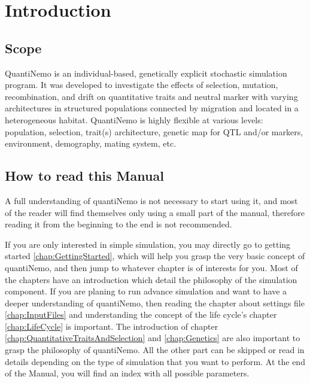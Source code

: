 \documentclass[letterpaper,12pt,oneside]{book}
\begin{document}
\frontmatter
\setcounter{tocdepth}{1}
\tableofcontents



\mainmatter
\setcounter{secnumdepth}{2}


\chapter{Introduction}\label{chap:Introduction}

\section{Scope}
QuantiNemo is an individual-based, genetically explicit stochastic simulation program. It was developed to investigate the effects of selection, mutation, recombination, and drift on quantitative traits and neutral marker with varying architectures in structured populations connected by migration and located in a heterogeneous habitat. QuantiNemo is highly flexible at various levels: population, selection, trait(s) architecture, genetic map for QTL and/or markers, environment, demography, mating system, etc.

\section{How to read this Manual}
A full understanding of quantiNemo is not necessary to start using it, and most of the reader will find themselves only using a small part of the manual, therefore reading it from the beginning to the end is not recommended. 

If you are only interested in simple simulation, you may directly go to getting started \ref{chap:GettingStarted}, which will help you grasp the very basic concept of quantiNemo, and then jump to whatever chapter is of interests for you. Most of the chapters have an introduction which detail the philosophy of the simulation component.  If you are planing to run advance simulation and want to have a deeper understanding of quantiNemo, then reading the chapter about settings file \ref{chap:InputFiles} and understanding the concept of the life cycle's chapter \ref{chap:LifeCycle} is important. The introduction of chapter \ref{chap:QuantitativeTraitsAndSelection} and \ref{chap:Genetics} are also important to grasp the philosophy of quantiNemo. All the other part can be skipped or read in details depending on the type of simulation that you want to perform. 
At the end of the Manual, you will find an index with all possible parameters. 
\end{document}
